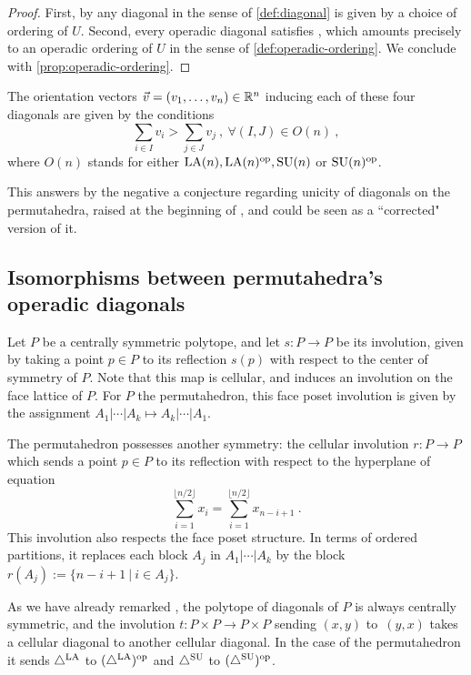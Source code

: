 \begin{proof}
    First, by \cite[Theorem 3.9]{LA21} any diagonal in the sense of \cref{def:diagonal} is given by a choice of ordering of $U$.
    Second, every operadic diagonal satisfies \cite[Proposition 4.14]{LA21}, which amounts precisely to an operadic ordering of $U$ in the sense of \cref{def:operadic-ordering}.
    We conclude with \cref{prop:operadic-ordering}.
\end{proof}

The orientation vectors $\vec v=(v_1,\ldots,v_{n}) \in \mathbb R^n$ inducing each of these four diagonals are given by the conditions \[ \sum_{i \in I} v_i > \sum_{j \in J} v_j \ , \ \forall (I,J) \in O(n) \ , \]
where $O(n)$ stands for either $\mathrm{LA}(n), \mathrm{LA}(n)^{\mathrm{op}}, \mathrm{SU}(n)$ or $\mathrm{SU}(n)^{\mathrm{op}}$.

\begin{remark}
    This answers by the negative a conjecture regarding unicity of diagonals on the permutahedra, raised at the beginning of \cite[Section 3]{SaneblidzeUmble04}, and could be seen as a ``corrected" version of it. 
\end{remark}


\subsection{Isomorphisms between permutahedra's operadic diagonals}

Let $P$ be a centrally symmetric polytope, and let $s : P \to P$ be its involution, given by taking a point $p \in P$ to its reflection $s(p)$ with respect to the center of symmetry of $P$. 
Note that this map is cellular, and induces an involution on the face lattice of $P$. 
For $P$ the permutahedron, this face poset involution is given by the assignment $A_1 | \cdots | A_k \mapsto A_k | \cdots | A_1$. 

The permutahedron possesses another symmetry: the cellular involution $r : P \to P$ which sends a point $p \in P$ to its reflection with respect to the hyperplane of equation \[ \sum_{i=1}^{\lfloor n/2 \rfloor}x_i = \sum_{i=1}^{\lfloor n/2 \rfloor}x_{n-i+1} \ . \]
This involution also respects the face poset structure. 
In terms of ordered partitions, it replaces each block $A_j$ in $A_1 | \cdots | A_k$ by the block $r(A_j):=\{n-i+1 \ | \ i \in A_j\}$.

As we have already remarked , the polytope of diagonals of $P$ is always centrally symmetric, and the involution $t : P \times P \to P \times P$ sending $(x,y)$ to~$(y,x)$ takes a cellular diagonal to another cellular diagonal.
In the case of the permutahedron it sends $\triangle^{\mathrm{LA}}$ to $(\triangle^{\mathrm{LA}})^{\mathrm{op}}$ and $\triangle^{\mathrm{SU}}$ to $(\triangle^{\mathrm{SU}})^{\mathrm{op}}$.

